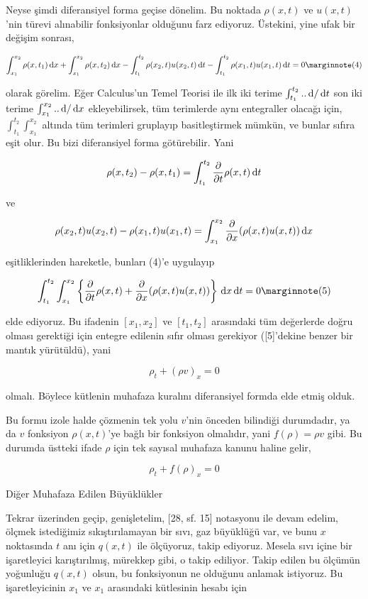 \documentclass[12pt,fleqn]{article}\usepackage{../../common}
\begin{document}
Neyse şimdi diferansiyel forma geçise dönelim. Bu noktada $\rho(x,t)$ ve
$u(x,t)$'nin türevi alınabilir fonksiyonlar olduğunu farz ediyoruz. Üstekini,
yine ufak bir değişim sonrası,

$$
\int_{x_1}^{x_2} \rho(x,t_1) \ud x  +
\int_{x_1}^{x_2} \rho(x,t_2) \ud x -
\int_{t_1}^{t_2}  \rho(x_2,t) u(x_2,t) \ud t -
\int_{t_1}^{t_2} \rho(x_1,t) u(x_1,t) \ud t = 0
\mlabel{4}
$$

olarak görelim. Eğer Calculus'un Temel Teorisi ile ilk iki terime
$\int_{t_1}^{t_2} .. \,\mathrm{d} / \,\mathrm{d} t$ son iki terime $\int_{x_1}^{x_2} .. \,\mathrm{d} / \,\mathrm{d} x$
ekleyebilirsek, tüm terimlerde aynı entegraller olacağı için, 
$\int_{t_1}^{t_2} \int_{x_1}^{x_2} $ altında tüm terimleri gruplayıp
basitleştirmek mümkün, ve bunlar sıfıra eşit olur. Bu bizi diferansiyel
forma götürebilir. Yani

$$
\rho(x,t_2) - \rho(x,t_1) = \int_{t_1}^{t_2}
\frac{\partial }{\partial t} \rho(x,t) \,\mathrm{d} t
$$

ve

$$
\rho(x_2,t)u(x_2,t) - \rho(x_1,t)u(x_1,t) =
\int_{x_1}^{x_2} \frac{\partial }{\partial x} (\rho(x,t)u(x,t)) \,\mathrm{d} x
$$

eşitliklerinden hareketle, bunları (4)'e uygulayıp

$$
\int_{t_1}^{t_2} \int_{x_1}^{x_2}  \left\{
\frac{\partial }{\partial t} \rho(x,t)  +
\frac{\partial }{\partial x} (\rho(x,t)u(x,t))
\right\} \ud x \ud t = 0
\mlabel{5}
$$

elde ediyoruz. Bu ifadenin $[x_1,x_2]$ ve $[t_1,t_2]$ arasındaki tüm değerlerde
doğru olması gerektiği için entegre edilenin sıfır olması gerekiyor ([5]'dekine
benzer bir mantık yürütüldü), yani

$$
\rho_t + (\rho v)_x = 0
$$

olmalı. Böylece kütlenin muhafaza kuralını diferansiyel formda elde etmiş olduk.

Bu formu izole halde çözmenin tek yolu $v$'nin önceden bilindiği durumdadır, ya
da $v$ fonksiyon $\rho(x,t)$'ye bağlı bir fonksiyon olmalıdır, yani
$f(\rho) = \rho v$ gibi. Bu durumda üstteki ifade $\rho$ için tek sayısal
muhafaza kanunu haline gelir,

$$
\rho_t + f(\rho)_x = 0
$$

Diğer Muhafaza Edilen Büyüklükler

Tekrar üzerinden geçip, genişletelim, [28, sf. 15] notasyonu ile devam edelim,
ölçmek istediğimiz sıkıştırılamayan bir sıvı, gaz büyüklüğü var, ve bunu $x$
noktasında $t$ anı için $q(x,t)$ ile ölçüyoruz, takip ediyoruz. Mesela sıvı
içine bir işaretleyici karıştırılmış, mürekkep gibi, o takip ediliyor. Takip
edilen bu ölçümün yoğunluğu $q(x,t)$ olsun, bu fonksiyonun ne olduğunu anlamak
istiyoruz. Bu işaretleyicinin $x_1$ ve $x_1$ arasındaki kütlesinin hesabı için
\end{document}
